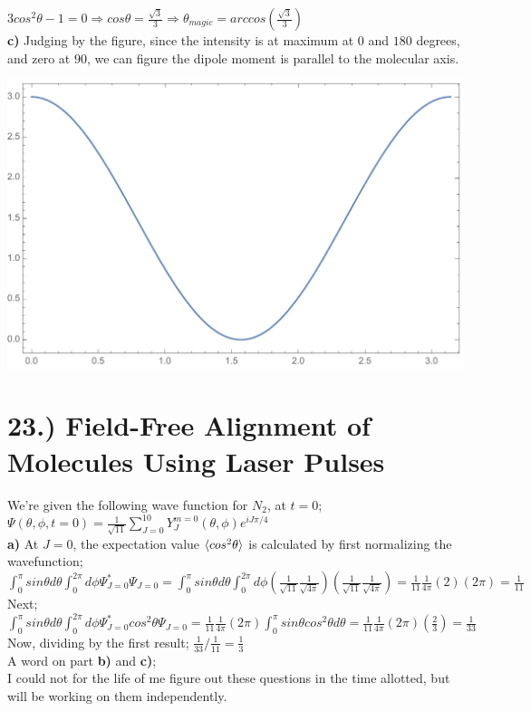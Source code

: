\documentclass[12pt]{article}
\begin{document}
$3cos^2\theta-1=0\Rightarrow cos\theta=\frac{\sqrt{3}}{3}\Rightarrow \theta_{magic}=arccos(\frac{\sqrt{3}}{3})$\\

\textbf{c)} Judging by the figure, since the intensity is at maximum at 0 and $180$ degrees, and zero at $90$, we can figure the dipole moment is parallel to the molecular axis.\\
\begin{center}
\includegraphics[width=0.8\linewidth]{pol.pdf}
\end{center}
\section*{23.) Field-Free Alignment of Molecules Using Laser Pulses}

We're given the following wave function for $N_2$, at $t=0$;  
$\Psi(\theta,\phi,t=0)=\frac{1}{\sqrt{11}}\sum_{J=0}^{10}Y_J^{m=0}(\theta,\phi)e^{iJ\pi/4}$\\

\textbf{a)} At $J=0$, the expectation value $\braket{cos^2\theta}$ is calculated by first normalizing the wavefunction;\\

${\displaystyle\int_0^\pi}sin\theta d\theta{\displaystyle\int_0^{2\pi}}d\phi\Psi_{J=0}^*\Psi_{J=0}={\displaystyle\int_0^\pi}sin\theta d\theta{\displaystyle\int_0^{2\pi}}d\phi(\frac{1}{\sqrt{11}}\frac{1}{\sqrt{4\pi}})(\frac{1}{\sqrt{11}}\frac{1}{\sqrt{4\pi}})=\frac{1}{11}\frac{1}{4\pi}(2)(2\pi)=\frac{1}{11}$\\

Next;
${\displaystyle\int_0^\pi}sin\theta d\theta{\displaystyle\int_0^{2\pi}}d\phi\Psi_{J=0}^*cos^2\theta\Psi_{J=0}=\frac{1}{11}\frac{1}{4\pi}(2\pi){\displaystyle\int_0^{\pi}}sin\theta cos^2\theta d\theta=\frac{1}{11}\frac{1}{4\pi}(2\pi)(\frac{2}{3})=\frac{1}{33}$\\

Now, dividing by the first result; $\frac{1}{33}/\frac{1}{11}=\frac{1}{3}$\\

A word on part \textbf{b)} and \textbf{c)};\\

I could not for the life of me figure out these questions in the time allotted, but will be working on them independently.
\end{document}
